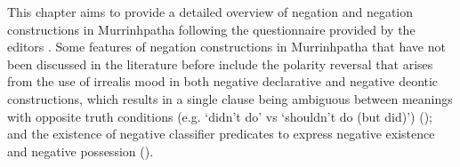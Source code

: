 \documentclass[output=paper,colorlinks,citecolor=brown]{langscibook}
\begin{document}
%
%
%

This chapter aims to provide a detailed overview of negation and negation constructions in Murrinhpatha following the questionnaire  provided by the editors . Some features of negation constructions in Murrinhpatha that have not been discussed in the literature before include the polarity reversal that arises from the use of irrealis mood in both negative declarative and negative deontic constructions, which results in a single clause being ambiguous between meanings with opposite truth conditions (e.g. ‘didn’t do’ vs ‘shouldn’t do (but did)’) (); and the existence of negative classifier predicates to express negative existence and negative possession ().
\end{document}
